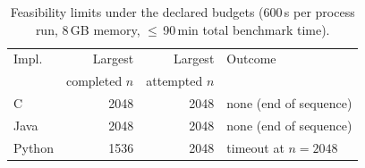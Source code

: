 \begin{table}[t]
\centering
\caption{Feasibility limits under the declared budgets (600\,s per process run, 8\,GB memory, $\leq$\,90\,min total benchmark time).}
\label{tab:limits}
\footnotesize
\begin{tabular}{@{}lrrl@{}}
\toprule
Impl. & Largest & Largest & Outcome \\
 & completed $n$ & attempted $n$ & \\
\midrule
C & 2048 & 2048 & none (end of sequence) \\
Java & 2048 & 2048 & none (end of sequence) \\
Python & 1536 & 2048 & timeout at $n=2048$ \\
\bottomrule
\end{tabular}
\end{table}
